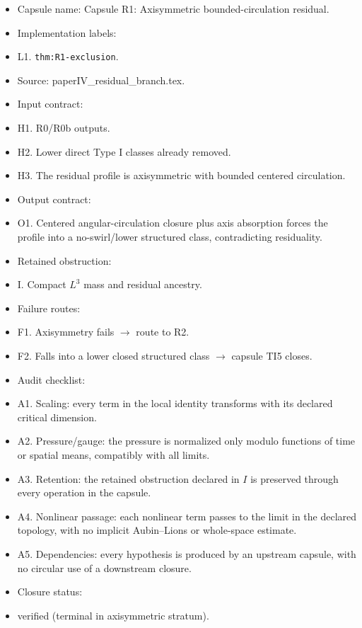 \documentclass[11pt]{amsart}
\begin{document}
\begin{itemize}
  \item Capsule name: Capsule R1: Axisymmetric bounded-circulation residual.
  \item Implementation labels:
  \item L1. \texttt{thm:R1-exclusion}.
  \item Source: paperIV\_residual\_branch.tex.
  \item Input contract:
  \item H1. R0/R0b outputs.
  \item H2. Lower direct Type I classes already removed.
  \item H3. The residual profile is axisymmetric with bounded centered circulation.
  \item Output contract:
  \item O1. Centered angular-circulation closure plus axis absorption forces the profile into a no-swirl/lower structured class, contradicting residuality.
  \item Retained obstruction:
  \item I. Compact $L^3$ mass and residual ancestry.
  \item Failure routes:
  \item F1. Axisymmetry fails $\to$ route to R2.
  \item F2. Falls into a lower closed structured class $\to$ capsule TI5 closes.
  \item Audit checklist:
  \item A1. Scaling: every term in the local identity transforms with its declared critical dimension.
  \item A2. Pressure/gauge: the pressure is normalized only modulo functions of time or spatial means, compatibly with all limits.
  \item A3. Retention: the retained obstruction declared in $I$ is preserved through every operation in the capsule.
  \item A4. Nonlinear passage: each nonlinear term passes to the limit in the declared topology, with no implicit Aubin--Lions or whole-space estimate.
  \item A5. Dependencies: every hypothesis is produced by an upstream capsule, with no circular use of a downstream closure.
  \item Closure status:
  \item verified (terminal in axisymmetric stratum).
\end{itemize}
\end{document}
